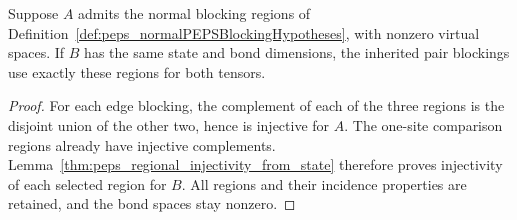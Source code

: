 \begin{definition}%
    \label{def:peps_normal_pair_blockings_from_state}
    \leanok

    Suppose $A$ admits the normal blocking regions of
    Definition~\ref{def:peps_normalPEPSBlockingHypotheses}, with nonzero
    virtual spaces. If $B$ has the same state and bond dimensions, the
    inherited pair blockings use exactly these regions for both tensors.
\end{definition}
\begin{proof}\leanok
    For each edge blocking, the complement of each of the three regions
    is the disjoint union of the other two, hence is injective for $A$.
    The one-site comparison regions already have injective complements.
    Lemma~\ref{thm:peps_regional_injectivity_from_state} therefore proves
    injectivity of each selected region for $B$. All regions and their
    incidence properties are retained, and the bond spaces stay nonzero.
\end{proof}

